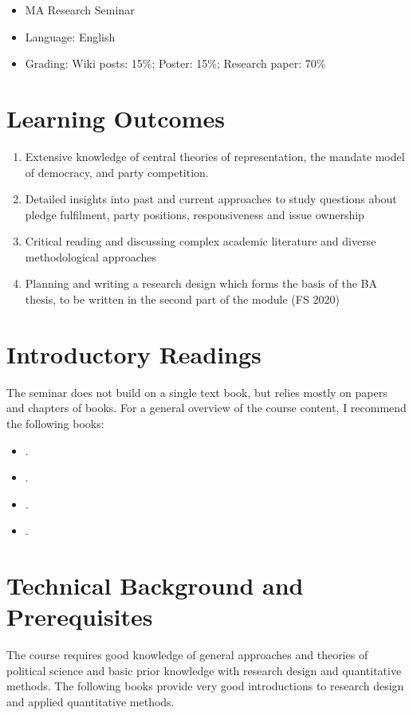 \documentclass[abstract=on,parskip=full,headings=standardclasses,fontsize=11pt,paper=a4]{scrartcl}
\begin{document}
\begin{itemize}
\item MA Research Seminar
\item  Language: English
\item Grading: Wiki posts: 15\%; Poster: 15\%;  Research paper: 70\%
\end{itemize}

\section*{Learning Outcomes}

\begin{enumerate}
\item Extensive knowledge of central theories of representation, the mandate model of democracy, and party competition. 
\item Detailed insights into past and current approaches to study questions about pledge fulfilment, party positions, responsiveness and issue ownership 
\item Critical reading and discussing  complex academic literature and diverse methodological approaches
\item Planning and writing a research design which forms the basis of the  BA thesis, to be written in the second part of the module (FS 2020)
\end{enumerate}

\section*{Introductory Readings}

The seminar does not build on a single text book, but relies mostly on papers and chapters of books. For  a general overview of the course content, I recommend the following books:

\begin{itemize}
\item {}.
\item {}.
\item {}.
\item {}.
\end{itemize}


\section*{Technical Background and Prerequisites}

The course requires good knowledge of general approaches and theories of political science and basic prior knowledge with research design and quantitative methods. The following books provide very good introductions to research design and applied quantitative methods.
\end{document}
